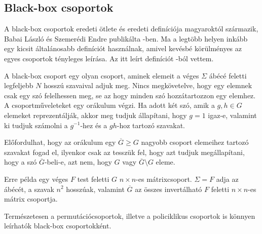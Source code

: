 \subsection{Black-box csoportok}
\label{subsec:blackbox}
A black-box csoportok eredeti ötlete és eredeti definíciója magyaroktól származik,
Babai László és Szemerédi Endre publikálta \cite{BS84}-ben.
Ma a legtöbb helyen inkább egy kicsit általánosabb definíciót használnak, amivel kevésbé körülményes az
egyes csoportok tényleges leírása. Az itt leírt definíciót \cite{Ser03}-ból vettem.

A black-box csoport egy olyan csoport,
aminek elemeit a véges $\Sigma$ ábécé feletti legfeljebb $N$ hosszú szavaival adjuk meg.
Nincs megkövetelve, hogy egy elemnek csak egy szó felelhessen meg, se az hogy minden szó hozzátartozzon
egy elemhez.
A csoportműveleteket egy orákulum végzi.
Ha adott két szó, amik a $g, h\in G$ elemeket reprezentálják,
akkor meg tudjuk állapítani, hogy $g=1$ igaz-e,
valamint ki tudjuk számolni a $g^{-1}$-hez és a $gh$-hoz tartozó szavakat.

Előfordulhat, hogy az orákulum egy $\overline{G} \ge G$ nagyobb csoport elemeihez tartozó szavakat fogad el,
ilyenkor csak az tesszük fel, hogy azt tudjuk megállapítani, hogy a szó $\overline{G}$-beli-e,
azt nem, hogy $G$ vagy $\overline{G}\setminus G$ eleme.

Erre példa egy véges $F$ test feletti $G$ $n\times n$-es mátrixcsoport.
$\Sigma=F$ adja az ábécét, a szavak $n^2$ hosszúak,
valamint $\overline{G}$ az összes invertálható $F$ feletti $n\times n$-es mátrix csoportja.

Természetesen a permutációcsoportok, illetve a policiklikus csoportok is könnyen leírhatók black-box csoportokként.
